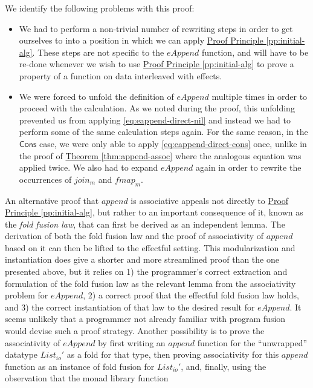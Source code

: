\documentclass{jfp1}
\newcommand{\proofprinref}[1]{\hyperref[#1]{Proof Principle \ref*{#1}}}
\newcommand{\thmref}[1]{\hyperref[#1]{Theorem \ref*{#1}}}
\begin{document}
We identify the following problems with this proof:
\begin{itemize}
\item We had to perform a non-trivial number of rewriting steps in
  order to get ourselves to into a position in which we can apply
  \proofprinref{pp:initial-alg}. These steps are not specific to the
  $\mathit{eAppend}$ function, and will have to be re-done whenever we
  wish to use \proofprinref{pp:initial-alg} to prove a property of a
  function on data interleaved with effects.
\item We were forced to unfold the definition of $\mathit{eAppend}$
  multiple times in order to proceed with the calculation. As we noted
  during the proof, this unfolding prevented us from applying
  \autoref{eq:eappend-direct-nil} and instead we had to perform some
  of the same calculation steps again. For the same reason, in the
  $\mathsf{Cons}$ case, we were only able to apply
  \autoref{eq:eappend-direct-cons} once, unlike in the proof of
  \thmref{thm:append-assoc} where the analogous equation was applied
  twice. We also had to expand $\mathit{eAppend}$ again in order to
  rewrite the occurrences of $\mathit{join_m}$ and $\mathit{fmap_m}$.
\end{itemize}
An alternative proof that $\mathit{append}$ is associative appeals not
directly to \proofprinref{pp:initial-alg}, but rather to an important
consequence of it, known as the {\em fold fusion law}, that can first
be derived as an independent lemma. The derivation of both the fold
fusion law and the proof of associativity of $\mathit{append}$ based
on it can then be lifted to the effectful setting. This modularization
and instantiation does give a shorter and more streamlined proof than
the one presented above, but it relies on 1) the programmer's correct
extraction and formulation of the fold fusion law as the relevant
lemma from the associativity problem for $\mathit{eAppend}$, 2) a
correct proof that the effectful fold fusion law holds, and 3) the
correct instantiation of that law to the desired result for
$\mathit{eAppend}$. It seems unlikely that a programmer not already
familiar with program fusion would devise such a proof
strategy. Another possibility is to prove the associativity of
$\mathit{eAppend}$ by first writing an $\mathit{append}$ function for
the ``unwrapped'' datatype $\mathit{List_{io}'}$ as a fold for that
type, then proving associativity for this $\mathit{append}$ function
as an instance of fold fusion for $\mathit{List_{io}'}$, and, finally,
using the observation that the monad library function
\end{document}

